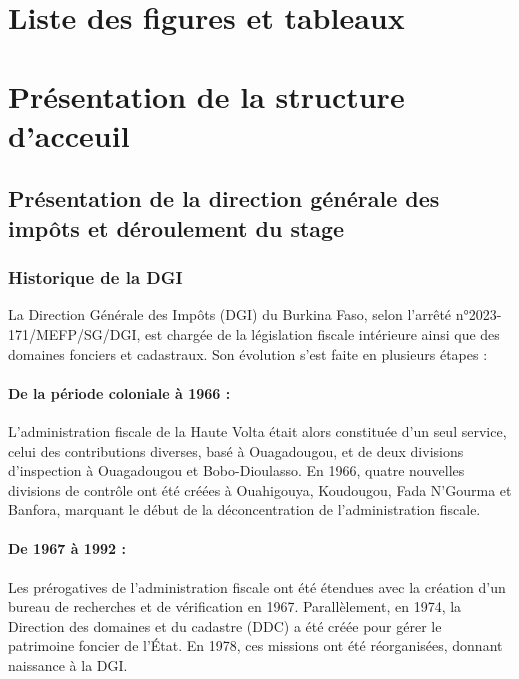 \documentclass[a4paper,12pt]{report}
\begin{document}
\chapter*{Liste des figures et tableaux}
\listoffigures
\listoftables

\chapter{Présentation de la structure d'acceuil}

\setcounter{section}{0}
\section*{Présentation de la direction générale des impôts et déroulement du stage}

\subsection*{Historique de la DGI}

La Direction Générale des Impôts (DGI) du Burkina Faso, selon l’arrêté n°2023-171/MEFP/SG/DGI, est chargée de la législation fiscale intérieure ainsi que des domaines fonciers et cadastraux. Son évolution s'est faite en plusieurs étapes :

\subsubsection*{De la période coloniale à 1966 :}  
L’administration fiscale de la Haute Volta était alors constituée d’un seul service, celui des contributions diverses, basé à Ouagadougou, et de deux divisions d’inspection à Ouagadougou et Bobo-Dioulasso. En 1966, quatre nouvelles divisions de contrôle ont été créées à Ouahigouya, Koudougou, Fada N’Gourma et Banfora, marquant le début de la déconcentration de l’administration fiscale.

\subsubsection*{De 1967 à 1992 :}  
Les prérogatives de l’administration fiscale ont été étendues avec la création d’un bureau de recherches et de vérification en 1967. Parallèlement, en 1974, la Direction des domaines et du cadastre (DDC) a été créée pour gérer le patrimoine foncier de l’État. En 1978, ces missions ont été réorganisées, donnant naissance à la DGI.
\end{document}
